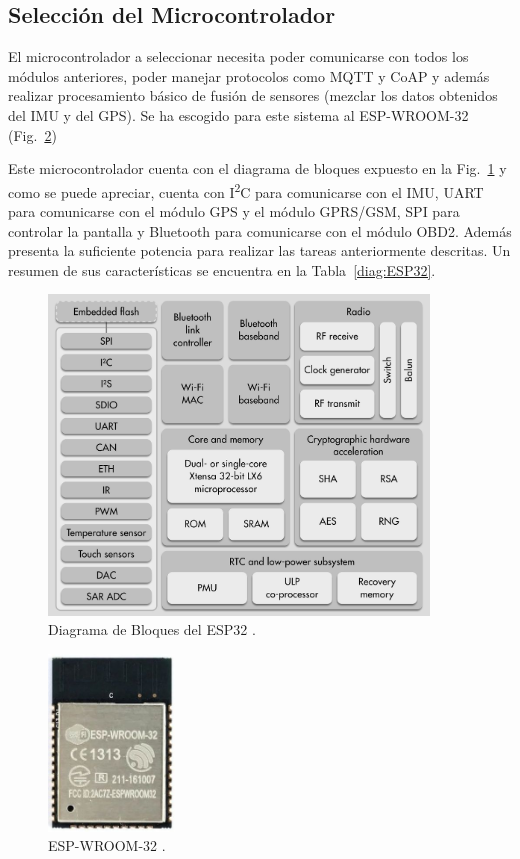 \subsection{Selección del Microcontrolador}
El microcontrolador a seleccionar necesita poder comunicarse con todos los módulos anteriores, poder manejar protocolos como MQTT y CoAP y además realizar procesamiento básico de fusión de sensores (mezclar los datos obtenidos del IMU y del GPS). Se ha escogido para este sistema al ESP-WROOM-32 (Fig.~\ref{fig:esp-wroom32})

Este microcontrolador cuenta con el diagrama de bloques expuesto en la Fig.~\ref{fig:Bloques_esp32} y como se puede apreciar, cuenta con I\textsuperscript{2}C para comunicarse con el IMU, UART para comunicarse con el módulo GPS y el módulo GPRS/GSM, SPI para controlar la pantalla y Bluetooth para comunicarse con el módulo OBD2. Además presenta la suficiente potencia para realizar las tareas anteriormente descritas. Un resumen de sus características se encuentra en la Tabla~\ref{diag:ESP32}.

\begin{figure}[hbtp!]
\centering
\includegraphics[width=0.9\textwidth]{ESP32_Function_Block_Diagram.jpg}
\caption{Diagrama de Bloques del ESP32  \cite{Esp32}.}
\label{fig:Bloques_esp32}
\end{figure}


\begin{figure}[hbtp!]
\centering
\includegraphics[width=0.3\textwidth]{esp32.jpg}
\caption{ESP-WROOM-32 \cite{ESP32_page}.}
\label{fig:esp-wroom32}
\end{figure}

